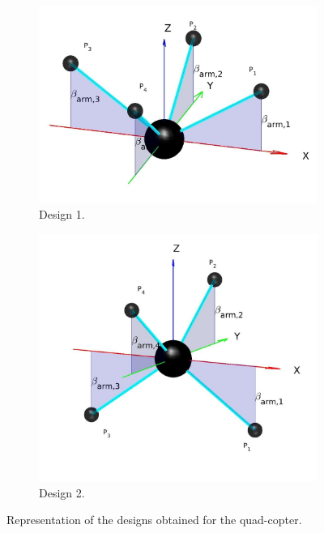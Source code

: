 \begin{figure}[!ht]
  \begin{center}
  \begin{subfigure}[b]{0.45\textwidth}
    \includegraphics[width=\linewidth]{images/Quadcopter2.jpg}
    \caption{Design 1.} \label{fig:Quadcopter_1}
  \end{subfigure}
  \hspace*{\fill} %
  \begin{subfigure}[b]{0.4\textwidth}
    \includegraphics[width=\linewidth]{images/Quadcopter.jpg}
    \caption{Design 2.} \label{fig:Quadcopter_2}
  \end{subfigure}
  \caption{Representation of the designs obtained for the quad-copter.}
  \label{fig:Quadcopter_result}
\end{center}
\end{figure}


